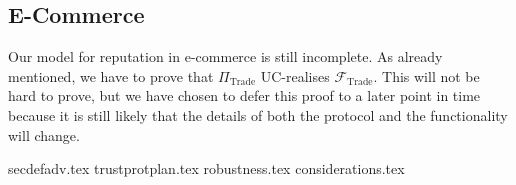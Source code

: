\subsection{E-Commerce}
  Our model for reputation in e-commerce is still incomplete. As already mentioned, we
  have to prove that $\Pi_{\mathrm{Trade}}$ UC-realises $\mathcal{F}_{\mathrm{Trade}}$.
  This will not be hard to prove, but we have chosen to defer this proof to a later point
  in time because it is still likely that the details of both the protocol and the
  functionality will change.

  {secdefadv.tex}
  {trustprotplan.tex}
  {robustness.tex}
  {considerations.tex}
